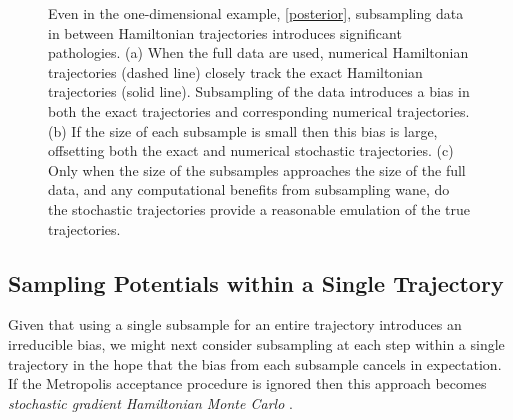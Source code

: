 \documentclass{article}
\begin{document}
\begin{figure}
\caption{Even in the one-dimensional example, \eqref{posterior}, subsampling
data in between Hamiltonian trajectories introduces significant pathologies.
(a) When the full data are used, numerical Hamiltonian trajectories (dashed line) 
closely track the exact Hamiltonian trajectories (solid line).  Subsampling of the
data introduces a bias in both the exact trajectories and corresponding
numerical trajectories.  (b) If the size of each subsample is small then this bias 
is large, offsetting both the exact and numerical stochastic trajectories. 
(c) Only when the size of the subsamples approaches the size of the full data, 
and any computational benefits from subsampling wane, do the stochastic 
trajectories provide a reasonable emulation of the true trajectories.}
\label{fig:level_sets}
\end{figure}

\subsection{Sampling Potentials within a Single Trajectory}

Given that using a single subsample for an entire trajectory introduces an
irreducible bias, we might next consider subsampling at each step within
a single trajectory in the hope that the bias from each subsample cancels
in expectation.  If the Metropolis acceptance procedure is ignored then this 
approach becomes \textit{stochastic gradient Hamiltonian Monte Carlo}
\cite{ChenEtAl:2014}.
\end{document}
